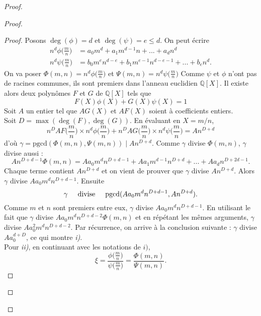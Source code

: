 \documentclass[a4paper]{article}
\begin{document}
\begin{proof}
\begin{proof}
\begin{proof}
Posons $\deg(\phi)=d$ et $\deg(\psi)=e\leqslant d$. On peut écrire
\begin{align*}
n^d\phi\Big(\frac{m}{n}\Big) &= a_{0}m^d+a_{1}m^{d-1}n+...+a_{d}n^d \\
n^d\psi\Big(\frac{m}{n}\Big) &= b_{0}m^en^{d-e}+b_{1}m^{e-1}n^{d-e-1}+...+b_{e}n^d.
\end{align*}
On va poser $\Phi(m,n)=n^d\phi\Big(\frac{m}{n}\Big)$ et $\Psi(m,n)=n^d\psi\Big(\frac{m}{n}\Big)$
Comme $\psi$ et $\phi$ n'ont pas de racines communes, ils sont premiers dans l'anneau euclidien $\mathbb{Q}[X]$. Il existe alors deux polynômes $F$ et $G$ de $\mathbb{Q}[X]$ tels que
\begin{equation*}
F(X)\phi(X)+G(X)\psi(X)=1
\end{equation*}
Soit $A$ un entier tel que $AG(X)$ et $AF(X)$ soient à coefficients entiers. \\
Soit $D=\max(\deg(F),\deg(G))$. En évaluant en $X=m/n$, 
\begin{equation*}
n^DAF\Big(\frac{m}{n}\Big) \times n^d\phi\Big(\frac{m}{n}\Big)+n^DAG\Big(\frac{m}{n}\Big)\times n^d\psi\Big(\frac{m}{n}\Big)=An^{D+d}
\end{equation*}
d'où
$\gamma=\text{pgcd}(\Phi(m,n),\Psi(m,n)) \mid An^{D+d}$.
Comme $\gamma$ divise $\Phi(m,n)$, $\gamma$ divise aussi :
\begin{equation*}
An^{D+d-1}\Phi(m,n)=Aa_{0}m^dn^{D+d-1}+Aa_{1}m^{d-1}n^{D+d}+...+Aa_{d}n^{D+2d-1}.
\end{equation*}
Chaque terme contient $An^{D+d}$ et on vient de prouver que $\gamma$ divise $An^{D+d}$. Alors $\gamma$ divise $Aa_{0}m^dn^{D+d-1}$. Ensuite
\begin{equation*}
\gamma \hspace{0.5cm} \text{divise} \hspace{0.5cm} \text{pgcd}( Aa_{0}m^dn^{D+d-1},An^{D+d}).
\end{equation*}
Comme $m$ et $n$ sont premiers entre eux, $\gamma$ divise $Aa_{0}m^dn^{D+d-1}$.
En utilisant le fait que $\gamma$ divise $Aa_{0}m^dn^{D+d-2}\Phi(m,n)$ et en répétant les mêmes arguments, $\gamma$ divise $Aa_{0}^2m^dn^{D+d-2}$. Par récurrence, on arrive à la conclusion suivante : $\gamma$ divise $Aa_{0}^{d+D}$, ce qui montre \textit{i)}. \\
Pour \textit{ii)}, 
en continuant avec les notations de $\textit{i)}$,
\begin{equation*}
\xi=\frac{\phi\Big(\frac{m}{n}\Big)}{\psi\Big(\frac{m}{n}\Big)}=\frac{\Phi(m,n)}{\Psi(m,n)}.
\end{equation*}


\end{proof}
\end{proof}
\end{proof}
\end{document}
